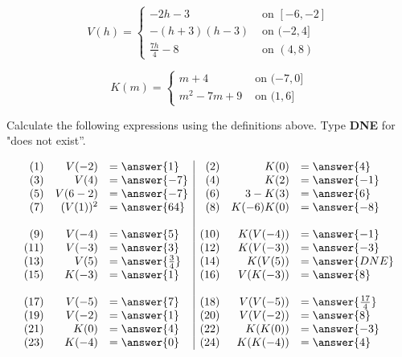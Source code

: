 \documentclass{ximera}
\begin{document}
\begin{question}


\[
V(h) = 
\begin{cases}
  -2h-3 & \text{ on } [-6, -2]   \\
  -(h+3)(h-3) & \text{ on } (-2, 4]  \\
  \frac{7h}{4} - 8 & \text{ on } (4,8)
\end{cases}
\]


\[
K(m) = 
\begin{cases}
  m+4 & \text{ on } (-7, 0]   \\
  m^2-7m+9 & \text{ on } (1,6]
\end{cases}
\]



Calculate the following expressions using the definitions above. Type \textbf{DNE} for "does not exist''.


\[
\begin{array}{rrl|rrl}
(1) & V(-2)  & = \answer{1} &  (2) &  K(0) & =\answer{4} \\
(3) & V(4)  & = \answer{-7} &  (4) &  K(2) & =\answer{-1} \\
(5) & V(6-2)  & = \answer{-7} &  (6) &  3-K(3) & =\answer{6} \\
(7) & (V(1))^2  & = \answer{64} &  (8) &  K(-6)K(0) & =\answer{-8} \\
    &           &               &      &            & \\
(9) & V(-4)  & = \answer{5} &  (10) &  K(V(-4)) & =\answer{-1} \\
(11) & V(-3)  & = \answer{3} &  (12) &  K(V(-3)) & =\answer{-3} \\
(13) & V(5)  & = \answer{\frac{3}{4}} &  (14) &  K(V(5)) & =\answer{DNE} \\
(15) & K(-3)  & = \answer{1} &  (16) &  V(K(-3)) & =\answer{8} \\
     &        &              &       &           & \\
(17) & V(-5)  & = \answer{7} &  (18) &  V(V(-5)) & =\answer{\frac{17}{4}} \\
(19) & V(-2)  & = \answer{1} &  (20) &  V(V(-2)) & =\answer{8} \\
(21) & K(0)  & = \answer{4} &  (22) &  K(K(0)) & =\answer{-3} \\
(23) & K(-4)  & = \answer{0} &  (24) &  K(K(-4)) & =\answer{4} 
\end{array}
\]


\end{question}
\end{document}
